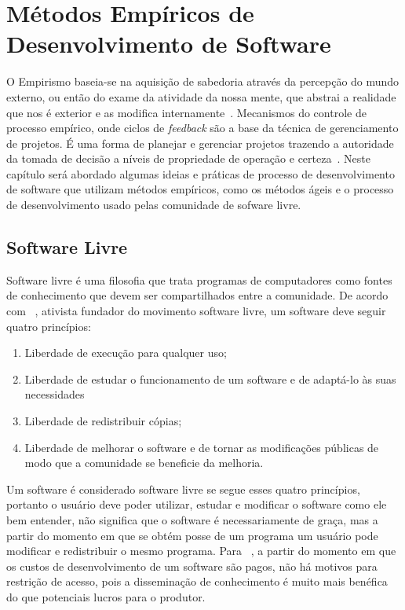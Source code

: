 \chapter{Métodos Empíricos de Desenvolvimento de Software}
\label{cap:desenvolvimento-empirico}

O Empirismo baseia-se na aquisição de sabedoria através da percepção do mundo 
externo, ou então do exame da atividade da nossa mente, que abstrai a realidade 
que nos é exterior e as modifica internamente~\cite{chaui2003}.
%
Mecanismos do controle de processo empírico, onde ciclos de \emph{feedback} são a base da técnica de gerenciamento de projetos.
%
É uma forma de planejar e gerenciar projetos trazendo a autoridade da tomada de decisão a níveis de propriedade de operação e certeza~\cite{Schwaber2004}.
%
Neste capítulo será abordado algumas ideias e práticas de processo de desenvolvimento
de software que utilizam métodos empíricos, como os métodos ágeis e o processo
de desenvolvimento usado pelas comunidade de sofware livre.
%
\section{Software Livre}

Software livre é uma filosofia que trata programas de computadores como fontes de 
conhecimento que devem ser compartilhados entre a comunidade.
%
De acordo com ~, ativista fundador do movimento software livre, um software deve seguir quatro princípios:
%
\begin{enumerate}
\item Liberdade de execução para qualquer uso;
\item Liberdade de estudar o funcionamento de um software e de adaptá-lo às suas 
necessidades
\item Liberdade de redistribuir cópias;
\item Liberdade de melhorar o software e de tornar as modificações públicas de modo 
que a comunidade se beneficie da melhoria.
\end{enumerate}
%
Um software é considerado software livre se segue esses quatro princípios, portanto 
o usuário deve poder utilizar, estudar e modificar o software como ele bem entender, 
não significa que o software é necessariamente de graça, mas a partir do momento em 
que se obtém posse de um programa um usuário pode modificar e redistribuir o mesmo 
programa.
%
Para ~, a partir do momento em que os custos de desenvolvimento de um software são pagos, não há motivos para restrição de acesso, pois a disseminação de conhecimento é muito mais benéfica do que potenciais lucros para o produtor.

